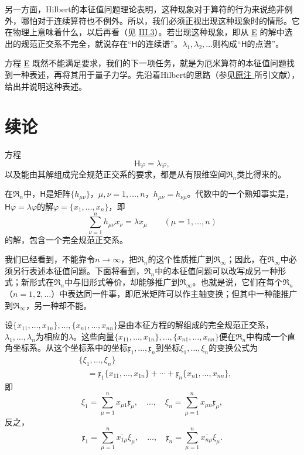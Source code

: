 \documentclass[fontsize=13pt,twoside,openany,headings=normal,parskip=false,bookmarkpackage=false,DIV=calc]{scrbook}
\begin{document}
另一方面，Hilbert的本征值问题理论表明，这种现象对于算符的行为来说绝非例外，哪怕对于连续算符也不例外。所以，我们必须正视出现这种现象时的情形。它在物理上意味着什么，以后再看（见 \hyperref[sec:III.3]{III.3}）。若出现这种现象，即从 \hyperref[eq:II.6.E]{E} 的解中选出的规范正交系不完全，就说存在“$\mathsf H$的连续谱”。$\lambda_1,\allowbreak \lambda_2,\allowbreak \ldots$则构成“$\mathsf H$的点谱”。

\hypertarget{origpage-56}{}\label{origpage-56}方程 \hyperref[eq:II.6.E]{E} 既然不能满足要求，我们的下一项任务，就是为厄米算符的本征值问题找到一种表述，再将其用于量子力学。先沿着Hilbert的思路（参见\CJKglue \hyperlink{note-70}{原注 } 所引文献），给出并说明这种表述。

\section{续论}\label{sec:II.7}
方程
\[
\mathsf H\varphi=\lambda\varphi,
\]
以及能由其解组成完全规范正交系的要求，都是从有限维空间$\mathfrak{R}_n$类比得来的。

在$\mathfrak{R}_n$中，$\mathsf H$是矩阵$\{h_{\mu\nu}\}$，$\mu,\allowbreak \nu=1,\allowbreak \ldots,\allowbreak n$，$h_{\mu\nu}=\overline{h_{\nu\mu}}$。代数中的一个熟知事实是，$\mathsf H\varphi=\lambda\varphi$的解$\varphi=\{x_1,\allowbreak \ldots,\allowbreak x_n\}$，即
\[
\sum_{\nu=1}^n h_{\mu\nu}x_\nu=\lambda x_\mu\qquad(\mu=1,\ldots,n)
\]
的解，包含一个完全规范正交系。

我们已经看到，不能靠令$n\to\infty$，把$\mathfrak{R}_n$的这个性质推广到$\mathfrak{R}_\infty$；因此，在$\mathfrak{R}_\infty$中必须另行表述本征值问题。下面将看到，$\mathfrak{R}_n$中的本征值问题可以改写成另一种形式；新形式在$\mathfrak{R}_n$中与旧形式等价，却能够推广到$\mathfrak{R}_\infty$。也就是说，它们在每个$\mathfrak{R}_n$（$n=1,\allowbreak 2,\allowbreak \ldots$）中表达同一件事，即厄米矩阵可以作主轴变换；但其中一种能推广到$\mathfrak{R}_\infty$，另一种却不能。

设$\{x_{11},\allowbreak \ldots,\allowbreak x_{1n}\},\allowbreak \ldots,\allowbreak \{x_{n1},\allowbreak \ldots,\allowbreak x_{nn}\}$是由本征方程的解组成的完全规范正交系，$\lambda_1,\allowbreak \ldots,\allowbreak \lambda_n$为相应的$\lambda$。这些向量$\{x_{11},\allowbreak \ldots,\allowbreak x_{1n}\},\allowbreak \ldots,\allowbreak \{x_{n1},\allowbreak \ldots,\allowbreak x_{nn}\}$便在$\mathfrak{R}_n$中构成一个直角坐标系。从这个坐标系中的坐标$\mathfrak{x}_1,\allowbreak \ldots,\allowbreak \mathfrak{x}_n$到坐标$\xi_1,\allowbreak \ldots,\allowbreak \xi_n$的变换公式为
\begin{align*}
&\{\xi_1,\ldots,\xi_n\}\\
&\quad=\mathfrak{x}_1\{x_{11},\ldots,x_{1n}\}+\cdots+\mathfrak{x}_n\{x_{n1},\ldots,x_{nn}\},
\end{align*}
即
\[
\xi_1=\sum_{\mu=1}^n x_{\mu1}\mathfrak{x}_\mu,\quad\ldots,\quad
\xi_n=\sum_{\mu=1}^n x_{\mu n}\mathfrak{x}_\mu,
\]
反之，
\[
\mathfrak{x}_1=\sum_{\mu=1}^n\overline{x_{1\mu}}\xi_\mu,\quad\ldots,\quad
\mathfrak{x}_n=\sum_{\mu=1}^n\overline{x_{n\mu}}\xi_\mu.
\]
\end{document}
